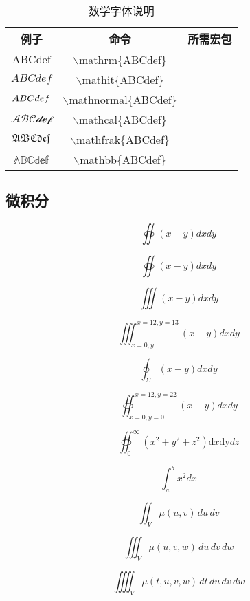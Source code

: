 \documentclass[UTF8]{ctexart}
\begin{document}
\begin{table}[H]
	\begin{center}
		\caption{数学字体说明}
		\begin{tabular}{c c  c}
		\hline 
		例子 & 命令 & 所需宏包                   \\%
		\hline 	
		$\mathrm{ABCdef}$   &  $\backslash$mathrm\{ABCdef\}   &    \\
		
		$\mathit{ABCdef}$   &  $\backslash$mathit\{ABCdef\}   &    \\
		
		$\mathnormal{ABCdef}$   &  $\backslash$mathnormal\{ABCdef\}   &    \\
		
		$\mathcal{ABCdef}$   &  $\backslash$mathcal\{ABCdef\}   &    \\


		$\mathfrak{ABCdef}$   &  $\backslash$mathfrak\{ABCdef\}   &    \\
		
		$\mathbb{ABCdef}$   &  $\backslash$mathbb\{ABCdef\}   &    \\

		\end{tabular}
	\end{center}
\end{table}


\subsection{微积分}
$$
\oiint{(x-y)dxdy}
$$


$$
\oiint{(x-y)dxdy}
$$


$$
\iiint{(x-y)dxdy}
$$

$$
\iiint_{x=0,y}^{x=12,y=13}{(x-y)dxdy}
$$

$$
\oint_{\Sigma}{(x-y)dxdy}
$$



\[
\displaystyle \oiint_{x=0,y=0}^{x=12,y=22}{(x-y)dxdy}
\]



\[
\displaystyle \oiint_{0}^{\infty}{(x^2+y^2+z^2) \mathrm dx \mathrm{dy} \mathit{dz}}
\]



\[
\int_{a}^{b} x^2 dx
\]

\[
\iint_V \mu(u,v) \,du\,dv
\]

$$\iiint_V \mu(u,v,w) \,du\,dv\,dw$$

$$\iiiint_V \mu(t,u,v,w) \,dt\,du\,dv\,dw$$
\end{document}
